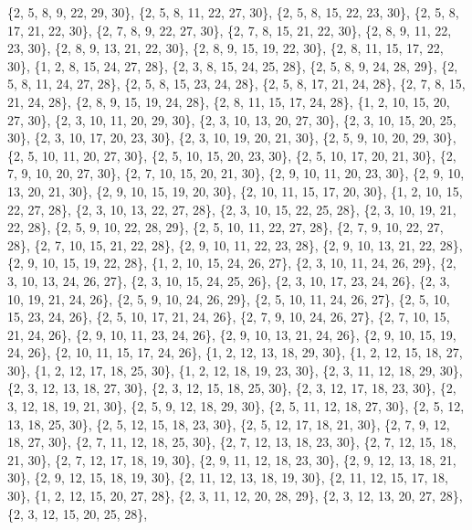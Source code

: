 \documentclass[11pt,a4paper]{article}
\begin{document}
{\{2, 5, 8, 9, 22, 29, 30\}, \{2, 5, 8, 11, 22, 27, 30\}, \{2, 5, 8, 15, 22, 23, 30\}, \{2, 5, 8, 17, 21, 22, 30\}, \{2, 7, 8, 9, 22, 27, 30\},
\{2, 7, 8, 15, 21, 22, 30\}, \{2, 8, 9, 11, 22, 23, 30\}, \{2, 8, 9, 13, 21, 22, 30\}, \{2, 8, 9, 15, 19, 22, 30\}, \{2, 8, 11, 15, 17, 22, 30\},
\{1, 2, 8, 15, 24, 27, 28\}, \{2, 3, 8, 15, 24, 25, 28\}, \{2, 5, 8, 9, 24, 28, 29\}, \{2, 5, 8, 11, 24, 27, 28\}, \{2, 5, 8, 15, 23, 24, 28\},
\{2, 5, 8, 17, 21, 24, 28\}, \{2, 7, 8, 15, 21, 24, 28\}, \{2, 8, 9, 15, 19, 24, 28\}, \{2, 8, 11, 15, 17, 24, 28\}, \{1, 2, 10, 15, 20, 27, 30\},
\{2, 3, 10, 11, 20, 29, 30\}, \{2, 3, 10, 13, 20, 27, 30\}, \{2, 3, 10, 15, 20, 25, 30\}, \{2, 3, 10, 17, 20, 23, 30\}, \{2, 3, 10, 19, 20, 21, 30\},
\{2, 5, 9, 10, 20, 29, 30\}, \{2, 5, 10, 11, 20, 27, 30\}, \{2, 5, 10, 15, 20, 23, 30\}, \{2, 5, 10, 17, 20, 21, 30\}, \{2, 7, 9, 10, 20, 27, 30\},
\{2, 7, 10, 15, 20, 21, 30\}, \{2, 9, 10, 11, 20, 23, 30\}, \{2, 9, 10, 13, 20, 21, 30\}, \{2, 9, 10, 15, 19, 20, 30\}, \{2, 10, 11, 15, 17, 20, 30\},
\{1, 2, 10, 15, 22, 27, 28\}, \{2, 3, 10, 13, 22, 27, 28\}, \{2, 3, 10, 15, 22, 25, 28\}, \{2, 3, 10, 19, 21, 22, 28\}, \{2, 5, 9, 10, 22, 28, 29\},
\{2, 5, 10, 11, 22, 27, 28\}, \{2, 7, 9, 10, 22, 27, 28\}, \{2, 7, 10, 15, 21, 22, 28\}, \{2, 9, 10, 11, 22, 23, 28\}, \{2, 9, 10, 13, 21, 22, 28\},
\{2, 9, 10, 15, 19, 22, 28\}, \{1, 2, 10, 15, 24, 26, 27\}, \{2, 3, 10, 11, 24, 26, 29\}, \{2, 3, 10, 13, 24, 26, 27\}, \{2, 3, 10, 15, 24, 25, 26\},
\{2, 3, 10, 17, 23, 24, 26\}, \{2, 3, 10, 19, 21, 24, 26\}, \{2, 5, 9, 10, 24, 26, 29\}, \{2, 5, 10, 11, 24, 26, 27\}, \{2, 5, 10, 15, 23, 24, 26\},
\{2, 5, 10, 17, 21, 24, 26\}, \{2, 7, 9, 10, 24, 26, 27\}, \{2, 7, 10, 15, 21, 24, 26\}, \{2, 9, 10, 11, 23, 24, 26\}, \{2, 9, 10, 13, 21, 24, 26\},
\{2, 9, 10, 15, 19, 24, 26\}, \{2, 10, 11, 15, 17, 24, 26\}, \{1, 2, 12, 13, 18, 29, 30\}, \{1, 2, 12, 15, 18, 27, 30\}, \{1, 2, 12, 17, 18, 25, 30\},
\{1, 2, 12, 18, 19, 23, 30\}, \{2, 3, 11, 12, 18, 29, 30\}, \{2, 3, 12, 13, 18, 27, 30\}, \{2, 3, 12, 15, 18, 25, 30\}, \{2, 3, 12, 17, 18, 23, 30\},
\{2, 3, 12, 18, 19, 21, 30\}, \{2, 5, 9, 12, 18, 29, 30\}, \{2, 5, 11, 12, 18, 27, 30\}, \{2, 5, 12, 13, 18, 25, 30\}, \{2, 5, 12, 15, 18, 23, 30\},
\{2, 5, 12, 17, 18, 21, 30\}, \{2, 7, 9, 12, 18, 27, 30\}, \{2, 7, 11, 12, 18, 25, 30\}, \{2, 7, 12, 13, 18, 23, 30\}, \{2, 7, 12, 15, 18, 21, 30\},
\{2, 7, 12, 17, 18, 19, 30\}, \{2, 9, 11, 12, 18, 23, 30\}, \{2, 9, 12, 13, 18, 21, 30\}, \{2, 9, 12, 15, 18, 19, 30\}, \{2, 11, 12, 13, 18, 19, 30\},
\{2, 11, 12, 15, 17, 18, 30\}, \{1, 2, 12, 15, 20, 27, 28\}, \{2, 3, 11, 12, 20, 28, 29\}, \{2, 3, 12, 13, 20, 27, 28\}, \{2, 3, 12, 15, 20, 25, 28\},
}
\end{document}
